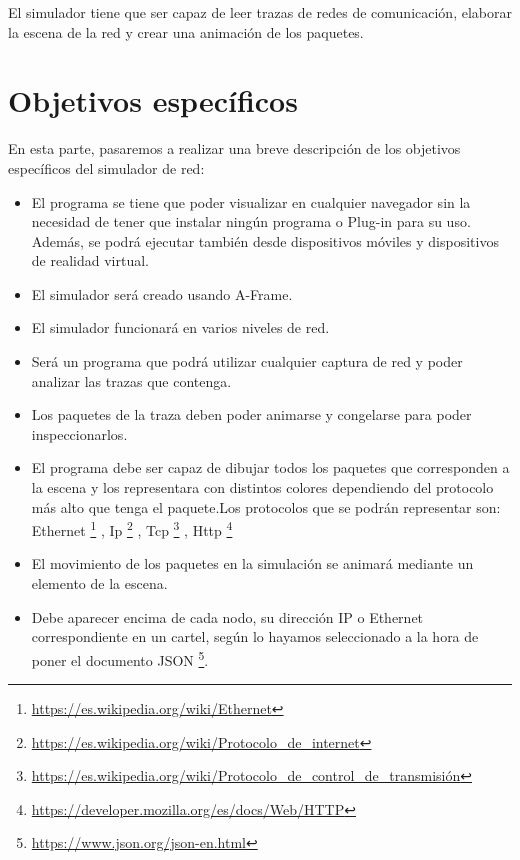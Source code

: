 \documentclass[a4paper, 12pt]{book}
\begin{document}
El simulador tiene que ser capaz de leer trazas de redes de comunicación, elaborar la escena de la red y crear una animación de los paquetes.

\section{Objetivos específicos}
\label{sec:objetivos-especificos}

En esta parte, pasaremos a realizar una breve descripción de los objetivos específicos del simulador de red:

\begin{itemize}
\item El programa se tiene que poder visualizar en cualquier navegador sin la necesidad de tener que instalar ningún programa o Plug-in para su uso. Además, se podrá ejecutar también desde dispositivos móviles y dispositivos de realidad virtual.

\item El simulador será creado usando A-Frame.

\item El simulador funcionará en varios niveles de red.

\item Será un programa que podrá utilizar cualquier captura de red y poder analizar las trazas que contenga.

\item Los paquetes de la traza deben poder animarse y congelarse para poder inspeccionarlos.

\item El programa debe ser capaz de dibujar todos los paquetes que corresponden a la escena y los representara con distintos colores dependiendo del protocolo más alto que tenga el paquete.Los protocolos que se podrán representar son: Ethernet
\footnote{\url{https://es.wikipedia.org/wiki/Ethernet}}
, Ip
\footnote{\url{https://es.wikipedia.org/wiki/Protocolo_de_internet}}
, Tcp
\footnote{\url{https://es.wikipedia.org/wiki/Protocolo_de_control_de_transmisión}}
, Http \footnote{\url{https://developer.mozilla.org/es/docs/Web/HTTP}}

\item El movimiento de los paquetes en la simulación se animará mediante un elemento de la escena.

\item Debe aparecer encima de cada nodo, su dirección IP o Ethernet correspondiente en un cartel, según lo hayamos seleccionado a la hora de poner el documento JSON
\footnote{\url{https://www.json.org/json-en.html}}.


\end{itemize}
\end{document}
